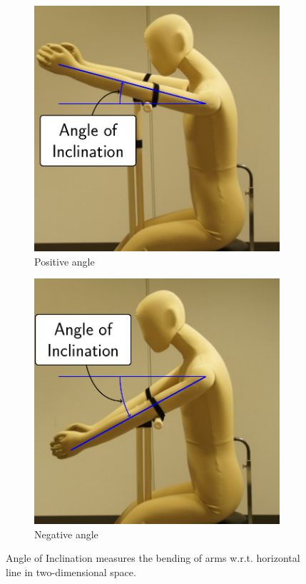 \documentclass[sigconf]{acmart}
\begin{document}
\begin{figure}
	\centering
	\begin{subfigure}{.5\linewidth}
		\includegraphics[width=.9\linewidth]{inclination_plus}
	    \caption{Positive angle}
	\end{subfigure}%
	\begin{subfigure}{.5\linewidth}
		\includegraphics[width=.9\linewidth]{inclination_minus}
	    \caption{Negative angle}
	\end{subfigure}
	\caption{Angle of Inclination measures the bending of arms w.r.t. horizontal line in two-dimensional space.}
	\label{fig:inclination}
\end{figure}
\end{document}
